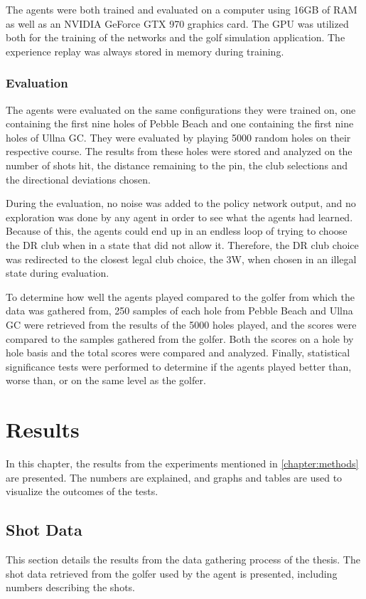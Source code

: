 \documentclass{kththesis}
\begin{document}
The agents were both trained and evaluated on a computer using 16GB of RAM as well as an NVIDIA GeForce GTX 970 graphics card. The GPU was utilized both for the training of the networks and the golf simulation application. The experience replay was always stored in memory during training.

\subsection{Evaluation}
The agents were evaluated on the same configurations they were trained on, one containing the first nine holes of Pebble Beach and one containing the first nine holes of Ullna GC. They were evaluated by playing 5000 random holes on their respective course. The results from these holes were stored and analyzed on the number of shots hit, the distance remaining to the pin, the club selections and the directional deviations chosen.

During the evaluation, no noise was added to the policy network output, and no exploration was done by any agent in order to see what the agents had learned. Because of this, the agents could end up in an endless loop of trying to choose the DR club when in a state that did not allow it. Therefore, the DR club choice was redirected to the closest legal club choice, the 3W, when chosen in an illegal state during evaluation.

To determine how well the agents played compared to the golfer from which the data was gathered from, 250 samples of each hole from Pebble Beach and Ullna GC were retrieved from the results of the 5000 holes played, and the scores were compared to the samples gathered from the golfer. Both the scores on a hole by hole basis and the total scores were compared and analyzed. Finally, statistical significance tests were performed to determine if the agents played better than, worse than, or on the same level as the golfer.

\chapter{Results}
\label{chapter:results}
In this chapter, the results from the experiments mentioned in \autoref{chapter:methods} are presented. The numbers are explained, and graphs and tables are used to visualize the outcomes of the tests.

\section{Shot Data}
This section details the results from the data gathering process of the thesis. The shot data retrieved from the golfer used by the agent is presented, including numbers describing the shots.
\end{document}
